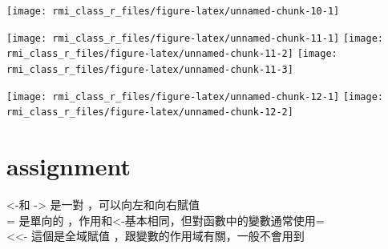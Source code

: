 \documentclass[]{book}
\newenvironment{Shaded}{\begin{snugshade}}{\end{snugshade}}
\newcommand{\DecValTok}[1]{\textcolor[rgb]{0.00,0.00,0.81}{#1}}
\newcommand{\KeywordTok}[1]{\textcolor[rgb]{0.13,0.29,0.53}{\textbf{#1}}}
\newcommand{\NormalTok}[1]{#1}
\newcommand{\OperatorTok}[1]{\textcolor[rgb]{0.81,0.36,0.00}{\textbf{#1}}}
\theoremstyle{definition}
\theoremstyle{definition}
\theoremstyle{definition}
\theoremstyle{remark}
\begin{document}
\begin{center}\texttt{[image: rmi\_class\_r\_files/figure-latex/unnamed-chunk-10-1]} \end{center}

\begin{Shaded}
\end{Shaded}

\begin{center}\texttt{[image: rmi\_class\_r\_files/figure-latex/unnamed-chunk-11-1]} \texttt{[image: rmi\_class\_r\_files/figure-latex/unnamed-chunk-11-2]} \texttt{[image: rmi\_class\_r\_files/figure-latex/unnamed-chunk-11-3]} \end{center}

\begin{Shaded}
\end{Shaded}

\begin{center}\texttt{[image: rmi\_class\_r\_files/figure-latex/unnamed-chunk-12-1]} \texttt{[image: rmi\_class\_r\_files/figure-latex/unnamed-chunk-12-2]} \end{center}

\hypertarget{assignment}{%
\section{assignment}\label{assignment}}

\textless{}-和 -\textgreater{} 是一對 ，可以向左和向右賦值\\
= 是單向的 ，作用和\textless{}-基本相同，但對函數中的變數通常使用=\\
\textless{}\textless{}- 這個是全域賦值
，跟變數的作用域有關，一般不會用到
\end{document}
